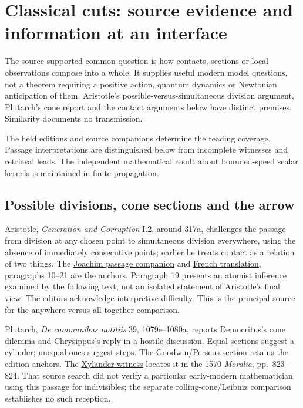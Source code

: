 \documentclass[11pt,a4paper]{article}
\begin{document}
\hypertarget{classical-cuts-source-evidence-and-information-at-an-interface}{%
\section{Classical cuts: source evidence and information at an
interface}\label{classical-cuts-source-evidence-and-information-at-an-interface}}

The source-supported common question is how contacts, sections or local
observations compose into a whole. It supplies useful modern model
questions, not a theorem requiring a positive action, quantum dynamics
or Newtonian anticipation of them. Aristotle's
possible-versus-simultaneous division argument, Plutarch's cone report
and the contact arguments below have distinct premises. Similarity
documents no transmission.

The held editions and source companions determine the reading coverage.
Passage interpretations are distinguished below from incomplete
witnesses and retrieval leads. The independent mathematical result about
bounded-speed scalar kernels is maintained in
\href{cut-paradox-two-faces.md}{finite propagation}.

\hypertarget{possible-divisions-cone-sections-and-the-arrow}{%
\subsection{Possible divisions, cone sections and the
arrow}\label{possible-divisions-cone-sections-and-the-arrow}}

Aristotle, \emph{Generation and Corruption} I.2, around 317a, challenges
the passage from division at any chosen point to simultaneous division
everywhere, using the absence of immediately consecutive points; earlier
he treats contact as a relation of two things. The
\href{../docs/classics/Aristotle_GC_I2_Joachim_cut_passages.md}{Joachim
passage companion} and
\href{../docs/classics/Aristotle_GC_I2_BarthelemySaintHilaire1866_fr_wikisource.md}{French
translation, paragraphs 10--21} are the anchors. Paragraph 19 presents
an atomist inference examined by the following text, not an isolated
statement of Aristotle's final view. The editors acknowledge
interpretive difficulty. This is the principal source for the
anywhere-versus-all-together comparison.

Plutarch, \emph{De communibus notitiis} 39, 1079e--1080a, reports
Democritus's cone dilemma and Chrysippus's reply in a hostile
discussion. Equal sections suggest a cylinder; unequal ones suggest
steps. The
\href{../docs/classics/Plutarch_DeCommunibusNotitiis_39_Goodwin1874_perseus.md}{Goodwin/Perseus
section} retains the edition anchors. The
\href{../docs/batches/H04/H04.md}{Xylander witness} locates it in the
1570 \emph{Moralia}, pp.~823--824. That source search did not verify a
particular early-modern mathematician using this passage for
indivisibles; the separate rolling-cone/Leibniz comparison establishes
no such reception.
\end{document}
